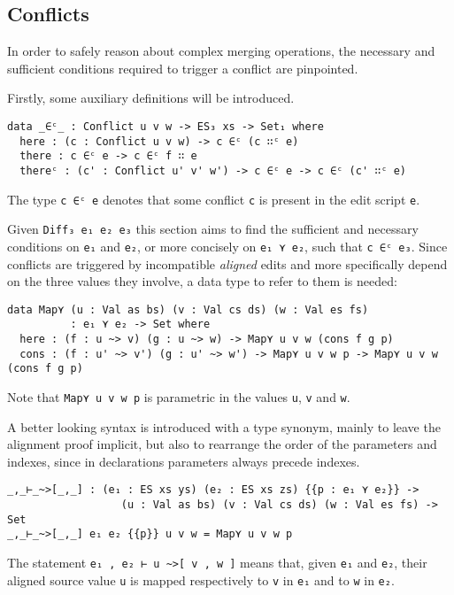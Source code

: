 \documentclass[../Thesis.tex]{subfiles}
\begin{document}
	\subsection{Conflicts}
	\label{subsec:conflicts}
		In order to safely reason about complex merging operations, 
		the necessary and sufficient conditions required to trigger a conflict are 
		pinpointed.

		Firstly, some auxiliary definitions will be introduced.
\begin{verbatim}
data _∈ᶜ_ : Conflict u v w -> ES₃ xs -> Set₁ where
  here : (c : Conflict u v w) -> c ∈ᶜ (c ∷ᶜ e)
  there : c ∈ᶜ e -> c ∈ᶜ f ∷ e
  thereᶜ : (c' : Conflict u' v' w') -> c ∈ᶜ e -> c ∈ᶜ (c' ∷ᶜ e)
\end{verbatim}

		The type \texttt{c ∈ᶜ e} denotes that some conflict \texttt{c}
		is present in the edit script \texttt{e}.

		Given \texttt{Diff₃ e₁ e₂ e₃} this section aims to find the sufficient and 
		necessary conditions on \texttt{e₁} and \texttt{e₂}, or more concisely
		on \texttt{e₁ ⋎ e₂}, such that \texttt{c ∈ᶜ e₃}.	
		Since conflicts are triggered by incompatible \emph{aligned} edits
		and more specifically depend on the three values they involve,
		a data type to refer to 	them is needed:
\begin{verbatim}
data Map⋎ (u : Val as bs) (v : Val cs ds) (w : Val es fs) 
          : e₁ ⋎ e₂ -> Set where
  here : (f : u ~> v) (g : u ~> w) -> Map⋎ u v w (cons f g p) 
  cons : (f : u' ~> v') (g : u' ~> w') -> Map⋎ u v w p -> Map⋎ u v w (cons f g p)
\end{verbatim}
	Note that \texttt{Map⋎ u v w p} is parametric in the values \texttt{u}, 
	\texttt{v} and \texttt{w}.
		
	A better looking syntax is introduced with a type synonym, mainly
	to leave the alignment proof implicit, but also to rearrange the order
	of the parameters and indexes, since in declarations parameters
	always precede indexes.
	
\begin{verbatim}
_,_⊢_~>[_,_] : (e₁ : ES xs ys) (e₂ : ES xs zs) {{p : e₁ ⋎ e₂}} -> 
                  (u : Val as bs) (v : Val cs ds) (w : Val es fs) -> Set
_,_⊢_~>[_,_] e₁ e₂ {{p}} u v w = Map⋎ u v w p
\end{verbatim}

	The statement \texttt{e₁ , e₂ ⊢ u \textasciitilde>[ v , w ]} means that, given
	\texttt{e₁} and \texttt{e₂}, their aligned source value \texttt{u} is mapped
	respectively to \texttt{v} in \texttt{e₁} and to \texttt{w} in \texttt{e₂}.
\end{document}
